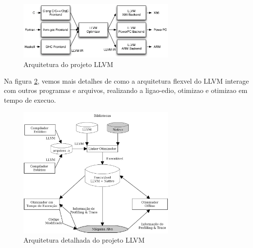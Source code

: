 \begin{figure}[htp]
  \begin{center}
    \includegraphics[width=0.7\textwidth]{figuras/llvmarch}
  \end{center}
  \caption{Arquitetura do projeto LLVM}
  \label{fig:llvmarch}
\end{figure}

Na figura \ref{fig:llvmarch2}, vemos mais detalhes de como a arquitetura flex\ih vel do LLVM interage com outros programas e arquivos, realizando a liga\ca o-edi\ca o, otimiza\ca o e otimiza\ca o em tempo de execu\ca o.

\begin{figure}[htp]
  \begin{center}
    \includegraphics[width=0.7\textwidth]{figuras/llvmarch2}
  \end{center}
  \caption{Arquitetura detalhada do projeto LLVM}
  \label{fig:llvmarch2}
\end{figure}


